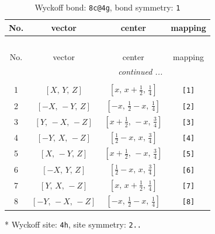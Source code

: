 \documentclass[fleqn,8pt]{jsarticle}
\begin{document}
\renewcommand{\arraystretch}{1.2}
\begin{longtable}{cccc}
\caption{Wyckoff bond: {\tt 8c@4g}, bond symmetry: {\tt 1}}
 \\
 \hline \hline
No. & vector & center & mapping \\ \hline \endfirsthead

\multicolumn{3}{l}{\tablename\ \thetable{}} \\
 \hline \hline
No. & vector & center & mapping \\ \hline \endhead

 \hline \hline
\multicolumn{3}{r}{\footnotesize\it continued ...} \\ \endfoot

 \hline \hline
\multicolumn{3}{r}{} \\ \endlastfoot

1 & $\left[ X,\, Y,\, Z \right]$ & $\left[ x,\, x + \frac{1}{2},\, \frac{1}{4} \right]$ & {\tt [1]} \\ \hline
2 & $\left[ - X,\, - Y,\, Z \right]$ & $\left[ - x,\, \frac{1}{2} - x,\, \frac{1}{4} \right]$ & {\tt [2]} \\ \hline
3 & $\left[ Y,\, - X,\, - Z \right]$ & $\left[ x + \frac{1}{2},\, - x,\, \frac{3}{4} \right]$ & {\tt [3]} \\ \hline
4 & $\left[ - Y,\, X,\, - Z \right]$ & $\left[ \frac{1}{2} - x,\, x,\, \frac{3}{4} \right]$ & {\tt [4]} \\ \hline
5 & $\left[ X,\, - Y,\, Z \right]$ & $\left[ x + \frac{1}{2},\, - x,\, \frac{3}{4} \right]$ & {\tt [5]} \\ \hline
6 & $\left[ - X,\, Y,\, Z \right]$ & $\left[ \frac{1}{2} - x,\, x,\, \frac{3}{4} \right]$ & {\tt [6]} \\ \hline
7 & $\left[ Y,\, X,\, - Z \right]$ & $\left[ x,\, x + \frac{1}{2},\, \frac{1}{4} \right]$ & {\tt [7]} \\ \hline
8 & $\left[ - Y,\, - X,\, - Z \right]$ & $\left[ - x,\, \frac{1}{2} - x,\, \frac{1}{4} \right]$ & {\tt [8]} \\
\end{longtable}
* Wyckoff site: {\tt 4h}, site symmetry: {\tt 2..}
\renewcommand{\arraystretch}{1.2}
\end{document}

